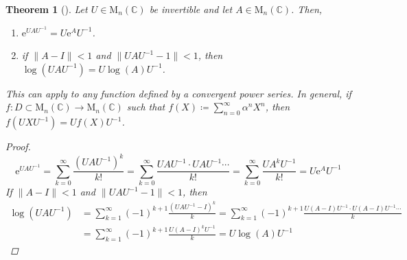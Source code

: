 \documentclass[letterpaper, 10pt]{article}
\theoremstyle{theostyle}
\newtheorem{theorem}{Theorem}[section]
\newenvironment{thmstyle}[1][]{%
    \begin{theorem}[#1]\leavevmode\vspace{-\baselineskip}\myquote%
    }{\endmyquote\end{theorem}}
\begin{document}
\begin{thmstyle}
    Let \(U \in \mathrm{M}_n (\mathbb{C})\) be invertible and let \(A \in \mathrm{M}_n (\mathbb{C})\).
    Then,
    \begin{enumerate}
        \item \(\mathrm{e}^{UAU^{-1}} = U \mathrm{e}^A U^{-1}\).
        \item if \(\lVert A - I\rVert < 1\) and \(\lVert UAU^{-1} - 1\rVert < 1\), then \(\log(UAU^{-1}) = U \log(A) U^{-1}\).
    \end{enumerate}
    This can apply to any function defined by a convergent power series.
    In general, if \(f: D \subset \mathrm{M}_n (\mathbb{C}) \rightarrow \mathrm{M}_n(\mathbb{C})\) such that 
    \(f(X) \coloneqq \displaystyle \sum_{n=0}^{\infty} \alpha^{n}X^n\), then \(f(UXU^{-1}) = Uf(X)U^{-1}\).
    \begin{proof}
    \[\mathrm{e}^{UAU^{-1}} = \sum_{k = 0}^\infty \frac{\left(UAU^{-1}\right)^k}{k!} = \sum_{k = 0}^\infty \frac{UAU^{-1} \cdot UAU^{-1} \cdots}{k!}
            = \sum_{k = 0}^\infty \frac{UA^k U^{-1}}{k!} = U \mathrm{e}^A U^{-1}\]
     If \(\lVert A - I\rVert < 1\) and \(\lVert UAU^{-1} - 1\rVert < 1\), then 
     \begin{align*}
        \log{(UAU^{-1})} &= \sum_{k = 1}^\infty (-1)^{k+1} \frac{\left(UAU^{-1} - I\right)^k}{k} = \sum_{k = 1}^\infty (-1)^{k+1} \frac{U(A - I)U^{-1} \cdot U(A-I)U^{-1} \cdots}{k} \\
        &= \sum_{k = 1}^\infty  (-1)^{k+1} \frac{U(A - I)^k U^{-1}}{k} = U \log{(A)} U^{-1}
     \end{align*}
    \end{proof}
\end{thmstyle}
\end{document}

